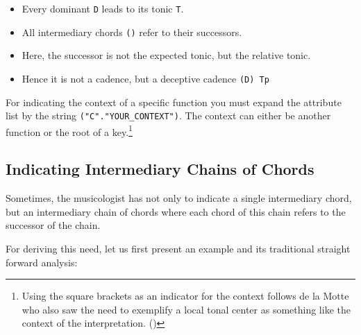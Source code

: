 \documentclass[
  DIV=calc,
  BCOR=5mm,
  12pt,
  headings=small,
  oneside,
  abstract=true,
  toc=bib,
  xcolor=dvipsnames,
  openany,
  ngerman,english]{scrartcl}
\begin{document}
\begin{itemize}
  \item Every dominant \texttt{D} leads to its tonic \texttt{T}.
  \item All intermediary chords \texttt{()} refer to their successors.
  \item Here, the successor is not the expected tonic, but the relative tonic.
  \item Hence it is not a cadence, but a deceptive cadence \texttt{(D) Tp}
\end{itemize}

For indicating the context of a specific function you must expand the attribute
list by the string \texttt{("C"."YOUR\_CONTEXT")}. The context can either be
another function or the root of a key.\footnote{Using the square brackets as an 
indicator for the context follows de la Motte who also saw the need to exemplify
a local tonal center as something like the context of the interpretation.
(\cite[cf.][144 et passim]{Delamotte2011a})}


\subsection{Indicating Intermediary Chains of Chords}

Sometimes, the musicologist has not only to indicate a single intermediary
chord, but an intermediary chain of chords where each chord of this chain
refers to the successor of the chain. 

For deriving this need, let us first present an example and its traditional
straight forward analysis:

\begin{center}
\end{center}
\end{document}
